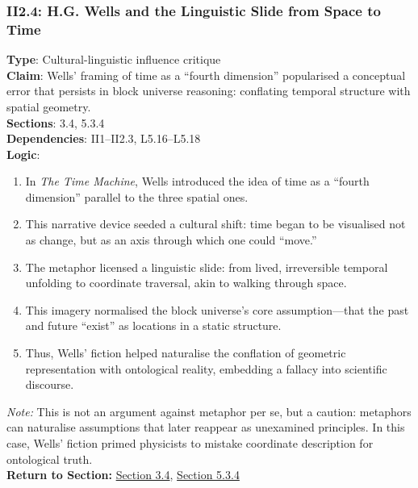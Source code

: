 \documentclass[12pt]{book}
\begin{document}
\subsubsection*{II2.4: H.G. Wells and the Linguistic Slide from Space to Time}
\label{appendix:II2.4}
\textbf{Type}: Cultural-linguistic influence critique\\
\textbf{Claim}: Wells' framing of time as a ``fourth dimension'' popularised a conceptual error that persists in block universe reasoning: conflating temporal structure with spatial geometry.\\
\textbf{Sections}: 3.4, 5.3.4\\
\textbf{Dependencies}: II1–II2.3, L5.16–L5.18\\
\textbf{Logic}:
\begin{enumerate}
    \item In \textit{The Time Machine}, Wells introduced the idea of time as a ``fourth dimension'' parallel to the three spatial ones.
    \item This narrative device seeded a cultural shift: time began to be visualised not as change, but as an axis through which one could ``move.''
    \item The metaphor licensed a linguistic slide: from lived, irreversible temporal unfolding to coordinate traversal, akin to walking through space.
    \item This imagery normalised the block universe's core assumption---that the past and future ``exist'' as locations in a static structure.
    \item Thus, Wells' fiction helped naturalise the conflation of geometric representation with ontological reality, embedding a fallacy into scientific discourse.
\end{enumerate}
\textit{Note:} This is not an argument against metaphor per se, but a caution: metaphors can naturalise assumptions that later reappear as unexamined principles. In this case, Wells' fiction primed physicists to mistake coordinate description for ontological truth.\\
\textbf{Return to Section:} \hyperref[sec:3.4]{Section 3.4}, \hyperref[sec:5.3.4]{Section 5.3.4}
\end{document}
